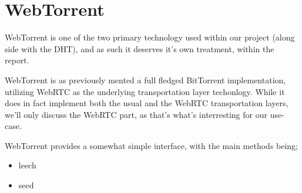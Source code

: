 \section{WebTorrent}

WebTorrent is one of the two primary technology used within our project (along 
side with the DHT), and as such it deserves it's own treatment, within the 
report.

WebTorrent is as previously mented a full fledged BitTorrent implementation, 
utilizing WebRTC as the underlying transportation layer techonlogy. While it 
does in fact implement both the usual and the WebRTC transportation layers,
we'll only discuss the WebRTC part, as that's what's interresting for our
use-case.

WebTorrent provides a somewhat simple interface, with the main methods being;
\begin{itemize}
\item leech
\item seed
\end{itemize}

